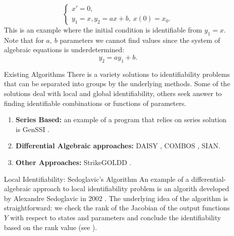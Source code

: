 \documentclass[final]{beamer}
\newlength{\sepwidth}
\newlength{\colwidth}
\newcommand{\separatorcolumn}{\begin{column}{\sepwidth}\end{column}}
\begin{document}
\begin{frame}[t]
\begin{columns}[t]
\begin{column}{\colwidth}
    \end{column}

    \separatorcolumn

    \begin{column}{\colwidth}
      \begin{example}[3]
        \begin{equation}
          \begin{cases}
            x'=0, \\
            y_1=x, y_2=ax+b,~x(0)=x_0.
          \end{cases}
          \label{example3}
        \end{equation}
        This is an example where the initial condition is identifiable from \(y_1=x\). Note that for \(a,~b\) parameters we cannot find values since the system of algebraic equations is underdetermined: \[y_2=ay_1+b.\]
      \end{example}
      \begin{block}{Existing Algorithms}
        There is a variety solutions to identifiability problems that can be separated into groups by the underlying methods. Some of the solutions deal with local and global identifiability, others seek answer to finding identifiable combinations or functions of parameters.
        \begin{enumerate}
          \item \textbf{Series Based:} an example of a program that relies on series solution is GenSSI \cite{chics2011genssi}.
          \item \textbf{Differential Algebraic approaches:} DAISY \cite{saccomani2008daisy,saccomani2019new}, COMBOS \cite{meshkat2014finding,kalami2020combos2}, SIAN\cite{hong2019sian,hong2020global}.
          \item \textbf{Other Approaches:} StrikeGOLDD \cite{villaverde2016strikegoldd}.
        \end{enumerate}

      \end{block}

      \begin{block}{Local Identifiability: Sedoglavic's Algorithm}
        An example of a differential-algebraic approach to local identifiability problem is an algorith developed by Alexandre Sedoglavic in 2002 \cite{sedoglavic2002probabilistic}. The underlying idea of the algorithm is straightforward: we check the rank of the Jacobian of the output functions \(Y\) with respect to states and parameters and conclude the identifiability based on the rank value (see \cite[Corollary 2.1]{sedoglavic2002probabilistic}).


\end{block}
\end{column}
\end{columns}
\end{frame}
\end{document}

